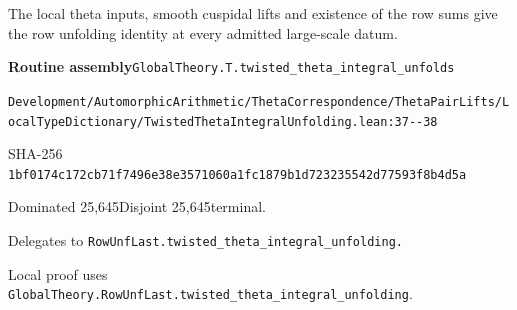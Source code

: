 
\begin{formalstatement}[D024]\label{decomp:D024}
The local theta inputs, smooth cuspidal lifts and existence of the row sums give the row unfolding identity at every admitted large-scale datum.
\end{formalstatement}
{\small\raggedright\noindent\textsf{\bfseries Routine assembly}\quad \nolinkurl{GlobalTheory.T.twisted_theta_integral_unfolds}\par\noindent \nolinkurl{Development/AutomorphicArithmetic/ThetaCorrespondence/ThetaPairLifts/LocalTypeDictionary/TwistedThetaIntegralUnfolding.lean:37--38}\par\noindent SHA-256 \nolinkurl{1bf0174c172cb71f7496e38e3571060a1fc1879b1d723235542d77593f8b4d5a}\par\noindent Dominated 25,645\quad Disjoint 25,645\quad terminal.\par}
Delegates to \nolinkurl{RowUnfLast.twisted_theta_integral_unfolding.}
{\small\raggedright Local proof uses \nolinkurl{GlobalTheory.RowUnfLast.twisted_theta_integral_unfolding}.\par}
